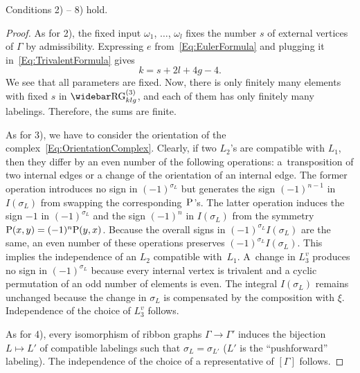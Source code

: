 \documentclass[\MainFolder/Text.tex]{subfiles}
\begin{document}
\begin{Lemma} \label{Lem:MCCond}
Conditions 2) -- 8) hold.
\end{Lemma}
\begin{proof}

As for 2), the fixed input $\omega_1$, $\dotsc$, $\omega_l$ fixes the number $s$ of external vertices of $\Gamma$ by admissibility. Expressing $e$ from~\eqref{Eq:EulerFormula} and plugging it  in~\eqref{Eq:TrivalentFormula} gives
\begin{equation} \label{Eq:MCk}
k = s + 2 l + 4g - 4.
\end{equation}
We see that all parameters are fixed. Now, there is only finitely many elements with fixed $s$ in $\TRRG_{klg}$, and each of them has only finitely many labelings. Therefore, the sums are finite.

As for 3), we have to consider the orientation of the complex~\eqref{Eq:OrientationComplex}. Clearly, if two $L_2$'s are compatible with $L_1$, then they differ by an even number of the following operations: a~transposition of two internal edges or a change of the orientation of an internal edge. The former operation introduces no sign in $(-1)^{\sigma_L}$ but generates the sign $(-1)^{n-1}$ in $I(\sigma_L)$ from swapping the corresponding~$\mathrm{P}$'s. The latter operation induces the sign $-1$ in $(-1)^{\sigma_L}$ and the sign $(-1)^n$ in $I(\sigma_L)$ from the symmetry $\mathrm{P}(x,y) = (-1)^n \mathrm{P}(y,x)$. Because the overall signs in $(-1)^{\sigma_L} I(\sigma_L)$ are the same, an even number of these operations preserves $(-1)^{\sigma_L} I(\sigma_L)$. This implies the independence of an $L_2$ compatible with~$L_1$. A~change in $L_3^v$ produces no sign in $(-1)^{\sigma_L}$ because every internal vertex is trivalent and a cyclic permutation of an odd number of elements is even. The integral $I(\sigma_L)$ remains unchanged because the change in $\sigma_L$ is compensated by the composition with $\xi$. Independence of the choice of $L_3^v$ follows.

As for 4), every isomorphism of ribbon graphs $\Gamma \rightarrow \Gamma'$ induces the bijection $L\mapsto L'$ of compatible labelings such that $\sigma_L = \sigma_{L'}$ ($L'$ is the ``pushforward'' labeling). The independence of the choice of a representative of $[\Gamma]$ follows.


\end{proof}
\end{document}

